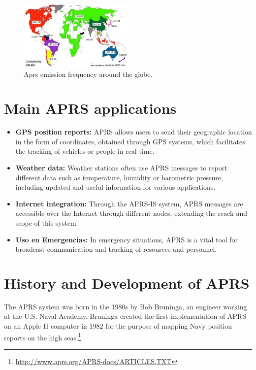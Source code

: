 \begin{figure}
	\centering
	\includegraphics[width=0.5\textwidth]{Imagenes/Chapter_1/mapa_frecuencias_aprs.jpg}
	\caption{Aprs emission frequency around the globe.}
	\label{fig:freq-map}
\end{figure}


\section{Main APRS applications}

\begin{itemize}
	\item \textbf{GPS position reports:} APRS allows users to send their geographic location in the form of coordinates, obtained through GPS systems, which facilitates the tracking of vehicles or people in real time.

	\item \textbf{Weather data:} Weather stations often use APRS messages to report different data such as temperature, humidity or barometric pressure, including updated and useful information for various applications.

	\item \textbf{Internet integration:} Through the APRS-IS system, APRS messages are accessible over the Internet through different nodes, extending the reach and scope of this system.

	\item \textbf{Uso en Emergencias:} In emergency situations, APRS is a vital tool for broadcast communication and tracking of resources and personnel.
\end{itemize}

\section{History and Development of APRS}

The APRS system was born in the 1980s by Bob Bruninga, an engineer working at the U.S. Naval Academy. Bruninga created the first implementation of APRS on an Apple II computer in 1982 for the purpose of mapping Navy position reports on the high seas.\footnote{\url{http://www.aprs.org/APRS-docs/ARTICLES.TXT}}

